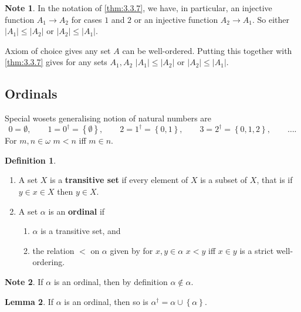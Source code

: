 \documentclass{article}
\newcommand{\cb}[1]{\left\{ #1 \right\}}
\newcommand{\abs}[1]{\left\lvert #1 \right\rvert}
\theoremstyle{definition}\newtheorem{definition}{Definition}[subsection]
\theoremstyle{definition}\newtheorem{remark}[definition]{Remark}
\theoremstyle{definition}\newtheorem*{example}{Example}
\theoremstyle{definition}\newtheorem*{note}{Note}
\newtheorem{lemma}[definition]{Lemma}
\begin{document}

\begin{note}
In the notation of \ref{thm:3.3.7}, we have, in particular, an injective function $ A_1 \to A_2 $ for cases $ 1 $ and $ 2 $ or an injective function $ A_2 \to A_1 $. So either $ \abs{A_1} \le \abs{A_2} $ or $ \abs{A_2} \le \abs{A_1} $.
\end{note}

Axiom of choice gives any set $ A $ can be well-ordered. Putting this together with \ref{thm:3.3.7} gives for any sets $ A_1, A_2 $ $ \abs{A_1} \le \abs{A_2} $ or $ \abs{A_2} \le \abs{A_1} $.

\subsection{Ordinals}

Special wosets generalising notion of natural numbers are
$$ 0 = \emptyset, \qquad 1 = 0^\dagger = \cb{\emptyset}, \qquad 2 = 1^\dagger = \cb{0, 1}, \qquad 3 = 2^\dagger = \cb{0, 1, 2}, \qquad \dots. $$
For $ m, n \in \omega $ $ m < n $ iff $ m \in n $.

\begin{definition}
\hfill
\begin{enumerate}
\item A set $ X $ is a \textbf{transitive set} if every element of $ X $ is a subset of $ X $, that is if $ y \in x \in X $ then $ y \in X $.
\item A set $ \alpha $ is an \textbf{ordinal} if
\begin{enumerate}
\item $ \alpha $ is a transitive set, and
\item the relation $ < $ on $ \alpha $ given by for $ x, y \in \alpha $ $ x < y $ iff $ x \in y $ is a strict well-ordering.
\end{enumerate}
\end{enumerate}
\end{definition}

\begin{note}
If $ \alpha $ is an ordinal, then by definition $ \alpha \notin \alpha $.
\end{note}

\begin{lemma}
\label{lem:3.4.2}
If $ \alpha $ is an ordinal, then so is $ \alpha^\dagger = \alpha \cup \cb{\alpha} $.
\end{lemma}
\end{document}
